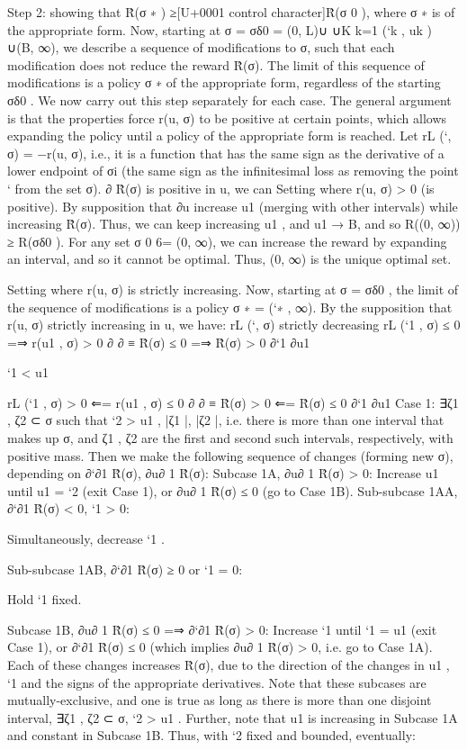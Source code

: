 \documentclass[10pt]{article}
\begin{document}
\begin{ReviewVerbatim}
Step 2: showing that R̂(σ ∗ ) ≥[U+0001 control character]R̂(σ 0 ), where σ ∗ is of the appropriate form. Now, starting
at σ = σδ0 = (0, L)∪ ∪K
k=1 (`k , uk ) ∪(B, ∞), we describe a sequence of modifications to σ, such that
each modification does not reduce the reward R̂(σ). The limit of this sequence of modifications is
a policy σ ∗ of the appropriate form, regardless of the starting σδ0 .
We now carry out this step separately for each case. The general argument is that the properties
force r(u, σ) to be positive at certain points, which allows expanding the policy until a policy of
the appropriate form is reached.
Let rL (`, σ) = −r(u, σ), i.e., it is a function that has the same sign as the derivative of a lower
endpoint of σi (the same sign as the infinitesimal loss as removing the point ` from the set σ).
∂
R̂(σ) is positive in u, we can
Setting where r(u, σ) > 0 (is positive). By supposition that ∂u
increase u1 (merging with other intervals) while increasing R̂(σ). Thus, we can keep increasing u1 ,
and u1 → B, and so R((0, ∞)) ≥ R(σδ0 ). For any set σ 0 6= (0, ∞), we can increase the reward by
expanding an interval, and so it cannot be optimal. Thus, (0, ∞) is the unique optimal set.

Setting where r(u, σ) is strictly increasing.
Now, starting at σ = σδ0 , the limit of the sequence of modifications is a policy σ ∗ = (`∗ , ∞).
By the supposition that r(u, σ) strictly increasing in u, we have:
rL (`, σ) strictly decreasing
rL (`1 , σ) ≤ 0 =⇒ r(u1 , σ) > 0
∂
∂
≡
R̂(σ) ≤ 0 =⇒
R̂(σ) > 0
∂`1
∂u1

`1 < u1

rL (`1 , σ) > 0 ⇐= r(u1 , σ) ≤ 0
∂
∂
≡
R̂(σ) > 0 ⇐=
R̂(σ) ≤ 0
∂`1
∂u1
Case 1: ∃ζ1 , ζ2 ⊂ σ such that `2 > u1 , |ζ1 |, |ζ2 |, i.e. there is more than one interval that
makes up σ, and ζ1 , ζ2 are the first and second such intervals, respectively, with positive mass.
Then we make the following sequence of changes (forming new σ), depending on ∂`∂1 R̂(σ), ∂u∂ 1 R̂(σ):
Subcase 1A, ∂u∂ 1 R̂(σ) > 0: Increase u1 until u1 = `2 (exit Case 1), or ∂u∂ 1 R̂(σ) ≤ 0 (go to Case
1B).
Sub-subcase 1AA, ∂`∂1 R̂(σ) < 0, `1 > 0:

Simultaneously, decrease `1 .

Sub-subcase 1AB, ∂`∂1 R̂(σ) ≥ 0 or `1 = 0:

Hold `1 fixed.

Subcase 1B, ∂u∂ 1 R̂(σ) ≤ 0 =⇒ ∂`∂1 R̂(σ) > 0: Increase `1 until `1 = u1 (exit Case 1), or ∂`∂1 R̂(σ) ≤
0 (which implies ∂u∂ 1 R̂(σ) > 0, i.e. go to Case 1A).
Each of these changes increases R̂(σ), due to the direction of the changes in u1 , `1 and the signs
of the appropriate derivatives. Note that these subcases are mutually-exclusive, and one is true
as long as there is more than one disjoint interval, ∃ζ1 , ζ2 ⊂ σ, `2 > u1 . Further, note that u1 is
increasing in Subcase 1A and constant in Subcase 1B. Thus, with `2 fixed and bounded, eventually:


\end{ReviewVerbatim}
\end{document}
